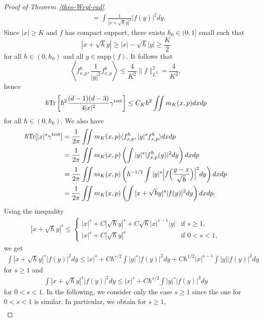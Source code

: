 \documentclass[%
11pt,  reqno]{amsart}
\theoremstyle{remarkstyle}
\newcommand{\1}{\hspace{0.2mm}\text{I}\hspace{0.2mm}}
\newcommand{\jb}[1]
{\langle #1 \rangle}
\DeclareMathOperator*{\test}{test}
\numberwithin{equation}{section}
\numberwithin{theorem}{section}
\begin{document}
\begin{proof}[Proof of Theorem~\ref{theo-Weyl-rad}]
\begin{align*}
			&= \int \frac{1}{|x+\sqrt{\hbar}y|^2} |f(y)|^2 dy.
		\end{align*}
		Since $|x|\geq K$ and $f$ has compact support, there exists $\hbar_0\in (0,1]$ small such that
		\[
		|x+\sqrt{\hbar}y|\geq |x| -\sqrt{\hbar}|y| \geq \frac{K}{2}
		\]
		for all $\hbar \in (0,\hbar_0)$ and all $y \in \text{supp}(f)$. It follows that  
		\[
		\left \langle f^{\hbar}_{x,p}, \frac{1}{|y|^2}f^{\hbar}_{x,p} \right \rangle \leq \frac{4}{K^2} \|f\|^2_{L^2} =\frac{4}{K^2},
		\]
		hence
		\begin{align} \label{iden-2}
			\hbar {\rm Tr}\left[\hbar^2 \frac{(d-1)(d-3)}{4|x|^2} \gamma^{\test}\right] \leq C_K \hbar^2 \iint m_K(x,p)dxdp
		\end{align}
		for all $\hbar \in (0,\hbar_0)$. We also have
		\begin{align*}
			\hbar {\rm Tr}[|x|^s \gamma^{\test}] &=\frac{1}{2\pi} \iint m_K(x,p) \jb{f^{\hbar}_{x,p}, |y|^s f^{\hbar}_{x,p}} dxdp \\
			&= \frac{1}{2\pi} \iint m_K(x,p) \left( \int |y|^s |f^{\hbar}_{x,p}(y)|^2 dy\right) dxdp \\
			&= \frac{1}{2\pi} \iint m_K(x,p) \left( \hbar^{-1/2}\int |y|^s \Big|f\Big(\frac{y-x}{\sqrt{\hbar}}\Big)\Big|^2 dy\right) dxdp \\
			&=\frac{1}{2\pi} \iint m_K(x,p) \left( \int |x+\sqrt{\hbar}y|^s |f(y)|^2 dy\right) dxdp.
		\end{align*}
		Using the inequality
		\begin{align} \label{diff-est}
			|x+\sqrt{\hbar} y|^s \leq \left\{
			\begin{array}{ll}
				|x|^s + C |\sqrt{\hbar}y|^s + C \sqrt{\hbar}|x|^{s-1} |y| &\text{if } s\geq 1, \\
				|x|^s + C |\sqrt{\hbar} y|^s &\text{if } 0<s<1,
			\end{array}
			\right.
		\end{align}
		we get
		\begin{align*}
			\int |x+\sqrt{\hbar}y|^s |f(y)|^2 dy \leq |x|^s + C\hbar^{s/2} \int |y|^s |f(y)|^2 dy + C\hbar^{1/2} |x|^{s-1} \int |y||f(y)|^2dy
		\end{align*}
		for $s\geq 1$ and
		\begin{align*}
			\int |x+\sqrt{\hbar}y|^s |f(y)|^2 dy \leq |x|^s + C\hbar^{s/2} \int |y|^s |f(y)|^2 dy
		\end{align*}
		for $0<s<1$. In the following, we consider only the case $s\geq 1$ since the one for $0<s<1$ is similar. In particular, we obtain for $s\geq 1$,
		\begin{align}\label{iden-3}

\end{align}
\end{proof}
\end{document}
